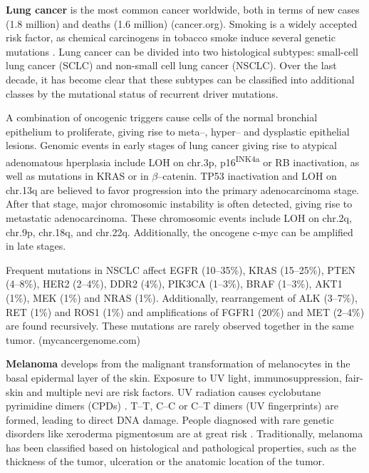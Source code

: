 {{      \textbf{Lung cancer} is the most common cancer worldwide, both in terms of
      new cases (1.8 million) and deaths (1.6 million) (cancer.org). Smoking is a widely
      accepted risk factor, as chemical carcinogens in tobacco smoke induce
      several genetic mutations {\cite{smoking_cancer}}. Lung cancer can be divided into two
      histological subtypes: small-cell lung cancer (SCLC) and non-small cell
      lung cancer (NSCLC). Over the last decade, it has become clear that these
      subtypes can be classified into  additional classes by the mutational
      status of recurrent driver mutations.

      A combination of oncogenic triggers cause cells of the normal bronchial
      epithelium to proliferate, giving rise to meta--, hyper-- and dysplastic
      epithelial lesions. Genomic events in early stages of lung cancer giving
      rise to atypical adenomatous hperplasia include LOH on chr.3p,
      p16\textsuperscript{INK4a} or RB inactivation, as well as mutations in
      KRAS or in $\beta$--catenin. TP53 inactivation and LOH on chr.13q are
      believed to favor progression into the primary adenocarcinoma stage. After
      that stage, major chromosomic instability is often detected, giving rise
      to metastatic adenocarcinoma. These chromosomic events include LOH on
      chr.2q, chr.9p, chr.18q, and chr.22q. Additionally, the oncogene c-myc can
      be amplified in late stages. {\cite{nsclc}}

      Frequent mutations in NSCLC affect EGFR (10--35\%), KRAS (15--25\%), PTEN
      (4--8\%), HER2 (2--4\%), DDR2 (4\%), PIK3CA (1--3\%), BRAF (1--3\%), AKT1
      (1\%), MEK (1\%) and NRAS (1\%). Additionally, rearrangement of ALK
      (3--7\%), RET (1\%) and ROS1 (1\%) and amplifications of FGFR1 (20\%) and
      MET (2--4\%) are found recursively. These mutations are rarely observed
      together in the same tumor. (mycancergenome.com)

      \textbf{Melanoma} develops from the malignant transformation of melanocytes
      in the basal epidermal layer of the skin. Exposure to UV light,
      immunosuppression, fair-skin and multiple nevi are risk factors. UV
      radiation causes cyclobutane pyrimidine dimers (CPDs) {\cite{melanoma_3}}. T--T, C--C or C--T
      dimers (UV fingerprints) are formed, leading to direct DNA damage. People
      diagnosed with rare genetic disorders like xeroderma pigmentosum are at
      great risk {\cite{xero}}. Traditionally, melanoma has been classified based on
      histological and pathological properties, such as the thickness of the
      tumor, ulceration or the anatomic location of the tumor.

}}
